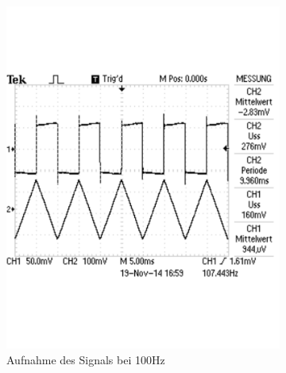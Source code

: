 \documentclass[12pt,a4paper]{article}
\begin{document}
\begin{figure}[H]
        \centering
        \begin{subfigure}[b]{0.28\textwidth}
                \includegraphics[width=\textwidth , scale = 0.4]{2_5_drei_100.pdf}
                \caption[Aufnahme des Signals bei 100Hz]{Aufnahme des Signals bei 100Hz}
                \label{fig:2_5_drei_100}
        \end{subfigure}%
        \hfill
        \begin{subfigure}[b]{0.28\textwidth}

\end{subfigure}
\end{figure}
\end{document}
